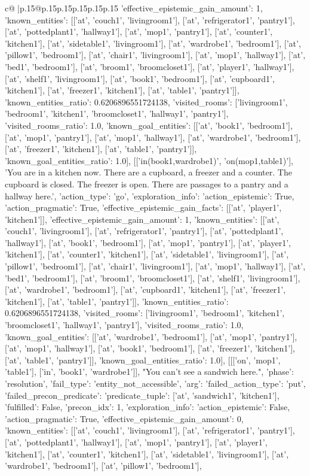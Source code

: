 \documentclass{article}
\begin{document}
{\begin{supertabular}{c@{$\;$}|p{.15\linewidth}@{}p{.15\linewidth}p{.15\linewidth}p{.15\linewidth}p{.15\linewidth}p{.15\linewidth}}
{{{'effective_epistemic_gain_amount': 1, 'known_entities': [['at', 'couch1', 'livingroom1'], ['at', 'refrigerator1', 'pantry1'], ['at', 'pottedplant1', 'hallway1'], ['at', 'mop1', 'pantry1'], ['at', 'counter1', 'kitchen1'], ['at', 'sidetable1', 'livingroom1'], ['at', 'wardrobe1', 'bedroom1'], ['at', 'pillow1', 'bedroom1'], ['at', 'chair1', 'livingroom1'], ['at', 'mop1', 'hallway1'], ['at', 'bed1', 'bedroom1'], ['at', 'broom1', 'broomcloset1'], ['at', 'player1', 'hallway1'], ['at', 'shelf1', 'livingroom1'], ['at', 'book1', 'bedroom1'], ['at', 'cupboard1', 'kitchen1'], ['at', 'freezer1', 'kitchen1'], ['at', 'table1', 'pantry1']], 'known_entities_ratio': 0.6206896551724138, 'visited_rooms': ['livingroom1', 'bedroom1', 'kitchen1', 'broomcloset1', 'hallway1', 'pantry1'], 'visited_rooms_ratio': 1.0, 'known_goal_entities': [['at', 'book1', 'bedroom1'], ['at', 'mop1', 'pantry1'], ['at', 'mop1', 'hallway1'], ['at', 'wardrobe1', 'bedroom1'], ['at', 'freezer1', 'kitchen1'], ['at', 'table1', 'pantry1']], 'known_goal_entities_ratio': 1.0}}], [['in(book1,wardrobe1)', 'on(mop1,table1)'], 'You are in a kitchen now. There are a cupboard, a freezer and a counter. The cupboard is closed. The freezer is open. There are passages to a pantry and a hallway here.', {'action_type': 'go', 'exploration_info': {'action_epistemic': True, 'action_pragmatic': True, 'effective_epistemic_gain_facts': [['at', 'player1', 'kitchen1']], 'effective_epistemic_gain_amount': 1, 'known_entities': [['at', 'couch1', 'livingroom1'], ['at', 'refrigerator1', 'pantry1'], ['at', 'pottedplant1', 'hallway1'], ['at', 'book1', 'bedroom1'], ['at', 'mop1', 'pantry1'], ['at', 'player1', 'kitchen1'], ['at', 'counter1', 'kitchen1'], ['at', 'sidetable1', 'livingroom1'], ['at', 'pillow1', 'bedroom1'], ['at', 'chair1', 'livingroom1'], ['at', 'mop1', 'hallway1'], ['at', 'bed1', 'bedroom1'], ['at', 'broom1', 'broomcloset1'], ['at', 'shelf1', 'livingroom1'], ['at', 'wardrobe1', 'bedroom1'], ['at', 'cupboard1', 'kitchen1'], ['at', 'freezer1', 'kitchen1'], ['at', 'table1', 'pantry1']], 'known_entities_ratio': 0.6206896551724138, 'visited_rooms': ['livingroom1', 'bedroom1', 'kitchen1', 'broomcloset1', 'hallway1', 'pantry1'], 'visited_rooms_ratio': 1.0, 'known_goal_entities': [['at', 'wardrobe1', 'bedroom1'], ['at', 'mop1', 'pantry1'], ['at', 'mop1', 'hallway1'], ['at', 'book1', 'bedroom1'], ['at', 'freezer1', 'kitchen1'], ['at', 'table1', 'pantry1']], 'known_goal_entities_ratio': 1.0}}], [[['on', 'mop1', 'table1'], ['in', 'book1', 'wardrobe1']], "You can't see a sandwich here.", {'phase': 'resolution', 'fail_type': 'entity_not_accessible', 'arg': {'failed_action_type': 'put', 'failed_precon_predicate': {'predicate_tuple': ['at', 'sandwich1', 'kitchen1'], 'fulfilled': False, 'precon_idx': 1}}, 'exploration_info': {'action_epistemic': False, 'action_pragmatic': True, 'effective_epistemic_gain_amount': 0, 'known_entities': [['at', 'couch1', 'livingroom1'], ['at', 'refrigerator1', 'pantry1'], ['at', 'pottedplant1', 'hallway1'], ['at', 'mop1', 'pantry1'], ['at', 'player1', 'kitchen1'], ['at', 'counter1', 'kitchen1'], ['at', 'sidetable1', 'livingroom1'], ['at', 'wardrobe1', 'bedroom1'], ['at', 'pillow1', 'bedroom1'], }}}
\end{supertabular}}
\end{document}
